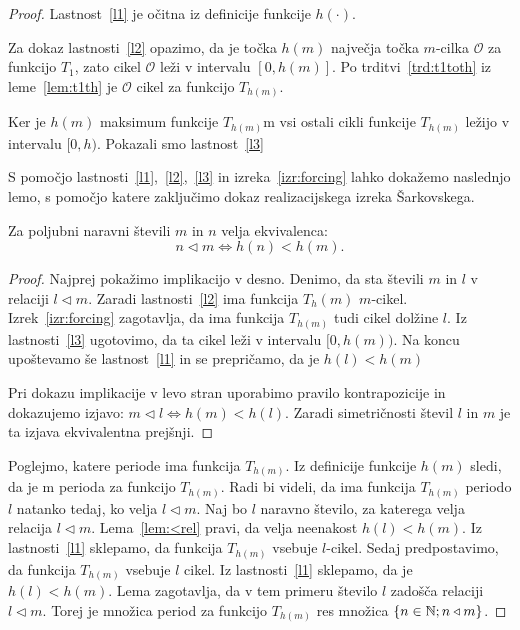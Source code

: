 \documentclass[../TG_magistrsko_delo_sections.tex]{subfiles}
\begin{document}
\begin{proof}
Lastnost~\ref{l1} je očitna iz definicije funkcije $h(\cdot)$.

Za dokaz lastnosti~\ref{l2} opazimo, da je točka $h(m)$ največja točka $m$-cilka $\mathcal{O}$ za funkcijo $T_1$, zato cikel $\mathcal{O}$ leži v intervalu $[0, h(m)]$. Po trditvi~\ref{trd:t1toth} iz leme~\ref{lem:t1th} je $\mathcal{O}$ cikel za funkcijo $T_{h(m)}$. 

Ker je $h(m)$ maksimum funkcije $T_{h(m)}$m vsi ostali cikli funkcije $T_{h(m)}$ ležijo v intervalu $[0, h)$. Pokazali smo lastnost~\ref{l3}

S pomočjo lastnosti~\ref{l1},~\ref{l2},~\ref{l3} in izreka~\ref{izr:forcing} lahko dokažemo naslednjo lemo, s pomočjo katere zaključimo dokaz realizacijskega izreka Šarkovskega.

\begin{lema}\label{lem:<rel}
Za poljubni naravni števili $m$ in $n$ velja ekvivalenca:
$$ n \triangleleft m \iff h(n) < h(m).$$
\end{lema}
\begin{proof}
Najprej pokažimo implikacijo v desno. Denimo, da sta števili $m$ in $l$ v relaciji $l \triangleleft m$. Zaradi lastnosti~\ref{l2} ima funkcija $T_h(m)$ $m$-cikel. Izrek~\ref{izr:forcing} zagotavlja, da ima funkcija $T_{h(m)}$ tudi cikel dolžine $l$. Iz lastnosti~\ref{l3} ugotovimo, da ta cikel leži v intervalu $[0, h(m))$. Na koncu upoštevamo še lastnost~\ref{l1} in se prepričamo, da je $h(l) < h(m)$

Pri dokazu implikacije v levo stran uporabimo pravilo kontrapozicije in dokazujemo izjavo: $ m \triangleleft l \iff h(m) < h(l)$. Zaradi simetričnosti števil $l$ in $m$ je ta izjava ekvivalentna prejšnji.
\end{proof}
Poglejmo, katere periode ima funkcija $T_{h(m)}$. Iz definicije funkcije $h(m)$ sledi, da je m perioda za funkcijo $T_{h(m)}$. Radi bi videli, da ima funkcija $T_{h(m)}$ periodo $l$ natanko tedaj, ko velja $l \triangleleft m$. Naj bo $l$ naravno število, za katerega velja relacija $l \triangleleft m$. Lema~\ref{lem:<rel} pravi, da velja neenakost $h(l) < h(m)$. Iz lastnosti~\ref{l1} sklepamo, da funkcija $T_{h(m)}$ vsebuje $l$-cikel. Sedaj predpostavimo, da funkcija $T_{h(m)}$ vsebuje $l$ cikel. Iz lastnosti~\ref{l1} sklepamo, da je $h(l) < h(m)$. Lema zagotavlja, da v tem primeru število $l$ zadošča relaciji $l \triangleleft m$. Torej je množica period za funkcijo $T_{h(m)}$ res množica $\{n \in \mathbb N; n \triangleleft m\}$.


\end{proof}
\end{document}

